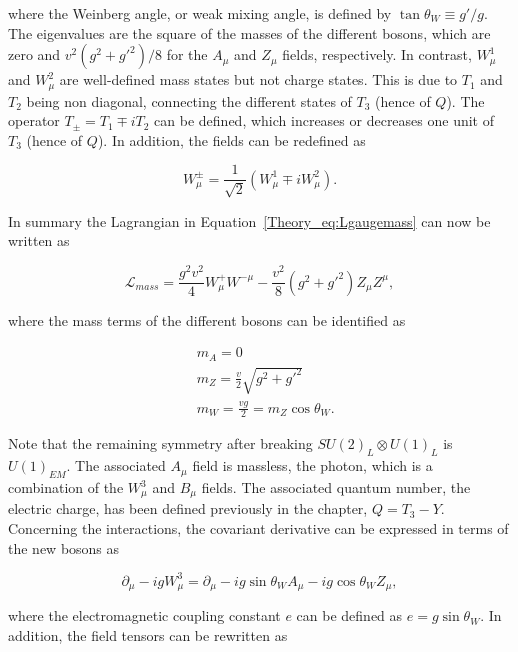 where the Weinberg angle, or weak mixing angle, is defined by $\tan\theta_W\equiv g'/g$. The eigenvalues are the square of the masses of the different bosons, which are zero and $v^2(g^2+g'^2)/8$ for the $A_\mu$ and $Z_\mu$ fields, respectively. In contrast, $W_\mu^1$ and $W_\mu^2$ are well-defined mass states but not charge states. This is due to $T_1$ and $T_2$ being non diagonal, connecting the different states of $T_3$ (hence of $Q$). The operator $T_\pm=T_1\mp iT_2$ can be defined, which increases or decreases one unit of $T_3$ (hence of $Q$). In addition, the fields can be redefined as

\begin{equation}
    W_\mu^\pm = \frac{1}{\sqrt{2}}(W_\mu^1\mp i W_\mu^2).
\end{equation}

In summary the Lagrangian in Equation~\ref{Theory_eq:Lgaugemass} can now be written as

\begin{equation}
    \mathcal{L}_{mass} = \frac{g^2v^2}{4}W_\mu^+W^{- \mu} - \frac{v^2}{8}(g^2+g'^2)Z_\mu Z^\mu,
\end{equation}

where the mass terms of the different bosons can be identified as

\begin{equation}
\begin{split}
    &m_A = 0\\
    &m_Z = \frac{v}{2}\sqrt{g^2+g'^2}\\
    &m_W = \frac{vg}{2} = m_Z \cos\theta_W.
\end{split}
\end{equation}

Note that the remaining symmetry after breaking $SU(2)_L\otimes U(1)_L$ is $U(1)_{EM}$. The associated $A_\mu$ field is massless, the photon, which is a combination of the $W_\mu^3$ and $B_\mu$ fields. The associated quantum number, the electric charge, has been defined previously in the chapter, $Q = T_3-Y$.\\

Concerning the interactions, the covariant derivative can be expressed in terms of the new bosons as

\begin{equation}
    \partial_\mu - igW_\mu^3 = \partial_\mu - ig\sin\theta_W A_\mu - ig\cos\theta_W Z_\mu,
\end{equation}

where the electromagnetic coupling constant $e$ can be defined as $e=g\sin\theta_W$. In addition, the field tensors can be rewritten as

